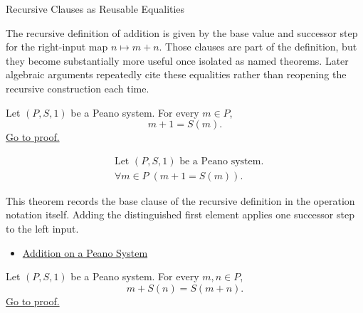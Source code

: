 \begin{topicbox}{Recursive Clauses as Reusable Equalities}
\begin{exposition}
The recursive definition of addition is given by the base value and successor
step for the right-input map $n \mapsto m+n$. Those clauses are part of the
definition, but they become substantially more useful once isolated as named
theorems. Later algebraic arguments repeatedly cite these equalities rather
than reopening the recursive construction each time.
\end{exposition}

\begin{tcolorbox}[colback=thmbox, colframe=thmborder, arc=2pt,
  left=6pt, right=6pt, top=4pt, bottom=4pt,
  title={\small\textbf{Theorem (Addition With \texorpdfstring{$1$}{1})}},
  fonttitle=\small\bfseries]
\begin{theorem}
\label{thm:addition-with-one}
Let $(P,S,1)$ be a Peano system. For every $m \in P$,
\[
m+1=S(m).
\]
\hyperref[prf:addition-with-one]{Go to proof.}
\end{theorem}
\end{tcolorbox}

\begin{remark*}
\[
\begin{aligned}
&\text{Let } (P,S,1) \text{ be a Peano system.}\\
&\forall m \in P\;(m+1=S(m)).
\end{aligned}
\]
\end{remark*}

\begin{remark*}[Interpretation]
This theorem records the base clause of the recursive definition in the
operation notation itself. Adding the distinguished first element applies one
successor step to the left input.
\end{remark*}

\begin{dependencies}
\begin{itemize}
  \item \hyperref[def:addition-on-peano-system]{Addition on a Peano System}
\end{itemize}
\end{dependencies}

\begin{tcolorbox}[colback=thmbox, colframe=thmborder, arc=2pt,
  left=6pt, right=6pt, top=4pt, bottom=4pt,
  title={\small\textbf{Theorem (Addition Successor on the Right)}},
  fonttitle=\small\bfseries]
\begin{theorem}
\label{thm:addition-successor-on-right}
Let $(P,S,1)$ be a Peano system. For every $m,n \in P$,
\[
m+S(n)=S(m+n).
\]
\hyperref[prf:addition-successor-on-right]{Go to proof.}
\end{theorem}
\end{tcolorbox}


\end{topicbox}
